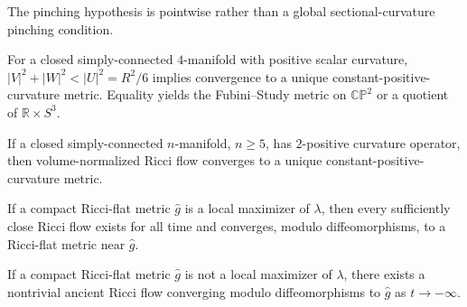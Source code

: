 \begin{remark}
\label{rem:chow-iv-pointwise-pinching}
The pinching hypothesis is pointwise rather than a global sectional-curvature
pinching condition.
\end{remark}

\begin{theorem}
\label{thm:chow-iv-margerin-pinching}
For a closed simply-connected $4$-manifold with positive scalar curvature,
$|V|^2+|W|^2<|U|^2=R^2/6$ implies convergence to a unique constant-positive-
curvature metric.  Equality yields the Fubini--Study metric on $\mathbb{CP}^2$
or a quotient of $\mathbb R\times S^3$.
\end{theorem}

\begin{theorem}
\label{thm:chow-iv-two-positive-curvature}
If a closed simply-connected $n$-manifold, $n\ge5$, has $2$-positive
curvature operator, then volume-normalized Ricci flow converges to a unique
constant-positive-curvature metric.
\end{theorem}

\begin{theorem}
\label{thm:chow-iv-ricci-flat-lambda-stability}
If a compact Ricci-flat metric $\hat g$ is a local maximizer of $\lambda$, then
every sufficiently close Ricci flow exists for all time and converges, modulo
diffeomorphisms, to a Ricci-flat metric near $\hat g$.
\end{theorem}

\begin{theorem}
\label{thm:chow-iv-ricci-flat-lambda-instability}
If a compact Ricci-flat metric $\hat g$ is not a local maximizer of $\lambda$,
there exists a nontrivial ancient Ricci flow converging modulo diffeomorphisms
to $\hat g$ as $t\to-\infty$.
\end{theorem}

